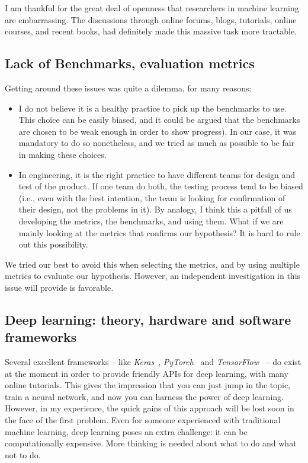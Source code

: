     \par I am thankful for the great deal of openness that researchers in machine learning are embarrassing. The discussions through online forums, blogs, tutorials, online courses, and recent books, had definitely made this massive task more tractable.

  \subsection{Lack of Benchmarks, evaluation metrics}
    Getting around these issues was quite a dilemma, for many reasons:

      \begin{itemize}
        \item I do not believe it is a healthy practice to pick up the benchmarks to use. This choice can be easily biased, and it could be argued that the benchmarks are chosen to be weak enough in order to show progress). In our case, it was mandatory to do so nonetheless, and we tried as much as possible to be fair in making these choices.
        \item In engineering, it is the right practice to have different teams for design and test of the product. If one team do both, the testing process tend to be biased (i.e., even with the best intention, the team is looking for confirmation of their design, not the problems in it). By analogy, I think this a pitfall of us developing the metrics, the benchmarks, and using them. What if we are mainly looking at the metrics that confirms our hypothesis? It is hard to rule out this possibility.
      \end{itemize}

    We tried our best to avoid this when selecting the metrics, and by using multiple metrics to evaluate our hypothesis. However, an independent investigation in this issue will provide is favorable.

  \subsection{Deep learning: theory, hardware and software frameworks}
    \par Several excellent frameworks -- like \textit{Keras}~\citep{chollet2015keras}, \textit{PyTorch}~\citep{paszke2017automatic} and \textit{TensorFlow}~\citep{tensorflow2015-whitepaper} -- do exist at the moment in order to provide friendly APIs for deep learning, with many online tutorials. This gives the impression that you can just jump in the topic, train a neural network, and now you can harness the power of deep learning. However, in my experience, the quick gains of this approach will be lost soon in the face of the first problem. Even for someone experienced with traditional machine learning, deep learning poses an extra challenge: it can be computationally expensive. More thinking is needed about what to do and what not to do.


